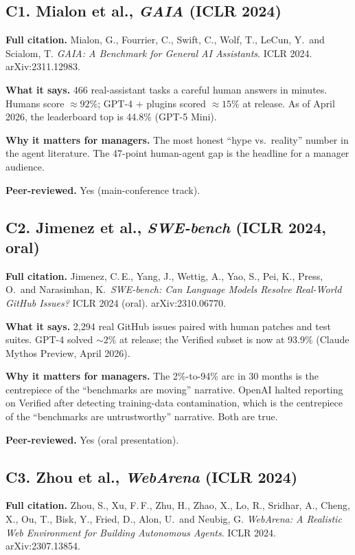 \documentclass[11pt,a4paper]{article}
\begin{document}
\subsection*{C1. Mialon et al., \emph{GAIA} (ICLR 2024)}

\textbf{Full citation.}
Mialon, G., Fourrier, C., Swift, C., Wolf, T., LeCun, Y.\ and Scialom, T.
\emph{GAIA: A Benchmark for General AI Assistants}. ICLR 2024.
arXiv:2311.12983.

\textbf{What it says.}
466 real-assistant tasks a careful human answers in minutes. Humans
score $\approx 92\%$; GPT-4 + plugins scored $\approx 15\%$ at release.
As of April 2026, the leaderboard top is 44.8\% (GPT-5 Mini).

\textbf{Why it matters for managers.}
The most honest ``hype vs.\ reality'' number in the agent literature.
The 47-point human-agent gap is the headline for a manager audience.

\textbf{Peer-reviewed.} Yes (main-conference track).

\subsection*{C2. Jimenez et al., \emph{SWE-bench} (ICLR 2024, oral)}

\textbf{Full citation.}
Jimenez, C.\,E., Yang, J., Wettig, A., Yao, S., Pei, K., Press, O.\
and Narasimhan, K.\
\emph{SWE-bench: Can Language Models Resolve Real-World GitHub Issues?}
ICLR 2024 (oral). arXiv:2310.06770.

\textbf{What it says.}
2{,}294 real GitHub issues paired with human patches and test suites.
GPT-4 solved $\sim 2\%$ at release; the Verified subset is now at
93.9\% (Claude Mythos Preview, April 2026).

\textbf{Why it matters for managers.}
The 2\%-to-94\% arc in 30 months is the centrepiece of the ``benchmarks
are moving'' narrative. OpenAI halted reporting on Verified after
detecting training-data contamination, which is the centrepiece of
the ``benchmarks are untrustworthy'' narrative. Both are true.

\textbf{Peer-reviewed.} Yes (oral presentation).

\subsection*{C3. Zhou et al., \emph{WebArena} (ICLR 2024)}

\textbf{Full citation.}
Zhou, S., Xu, F.\,F., Zhu, H., Zhao, X., Lo, R., Sridhar, A.,
Cheng, X., Ou, T., Bisk, Y., Fried, D., Alon, U.\ and Neubig, G.
\emph{WebArena: A Realistic Web Environment for Building Autonomous
Agents}. ICLR 2024. arXiv:2307.13854.
\end{document}
